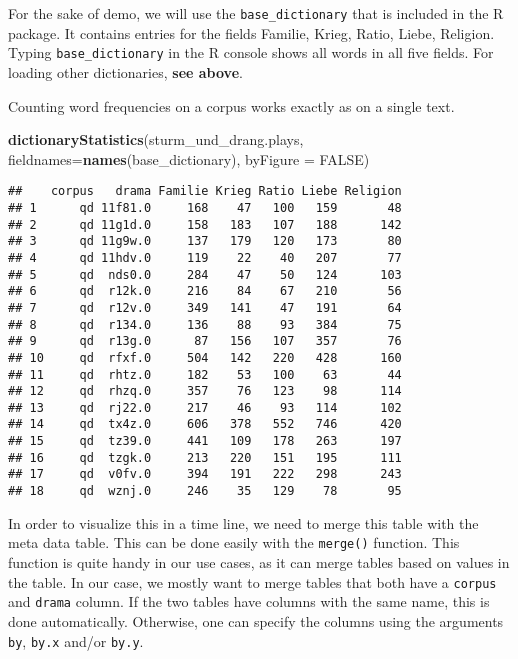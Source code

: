 \documentclass[]{book}
\newenvironment{Shaded}{\begin{snugshade}}{\end{snugshade}}
\newcommand{\DataTypeTok}[1]{\textcolor[rgb]{0.13,0.29,0.53}{#1}}
\newcommand{\KeywordTok}[1]{\textcolor[rgb]{0.13,0.29,0.53}{\textbf{#1}}}
\newcommand{\NormalTok}[1]{#1}
\newcommand{\OtherTok}[1]{\textcolor[rgb]{0.56,0.35,0.01}{#1}}
\begin{document}
For the sake of demo, we will use the \texttt{base\_dictionary} that is included in the R package. It contains entries for the fields Familie, Krieg, Ratio, Liebe, Religion. Typing \texttt{base\_dictionary} in the R console shows all words in all five fields. For loading other dictionaries, \textbf{see above}.

Counting word frequencies on a corpus works exactly as on a single text.

\begin{Shaded}
\begin{Highlighting}[]
\KeywordTok{dictionaryStatistics}\NormalTok{(sturm_und_drang.plays, }
                     \DataTypeTok{fieldnames=}\KeywordTok{names}\NormalTok{(base_dictionary), }
                     \DataTypeTok{byFigure =} \OtherTok{FALSE}\NormalTok{)}
\end{Highlighting}
\end{Shaded}

\begin{verbatim}
##    corpus   drama Familie Krieg Ratio Liebe Religion
## 1      qd 11f81.0     168    47   100   159       48
## 2      qd 11g1d.0     158   183   107   188      142
## 3      qd 11g9w.0     137   179   120   173       80
## 4      qd 11hdv.0     119    22    40   207       77
## 5      qd  nds0.0     284    47    50   124      103
## 6      qd  r12k.0     216    84    67   210       56
## 7      qd  r12v.0     349   141    47   191       64
## 8      qd  r134.0     136    88    93   384       75
## 9      qd  r13g.0      87   156   107   357       76
## 10     qd  rfxf.0     504   142   220   428      160
## 11     qd  rhtz.0     182    53   100    63       44
## 12     qd  rhzq.0     357    76   123    98      114
## 13     qd  rj22.0     217    46    93   114      102
## 14     qd  tx4z.0     606   378   552   746      420
## 15     qd  tz39.0     441   109   178   263      197
## 16     qd  tzgk.0     213   220   151   195      111
## 17     qd  v0fv.0     394   191   222   298      243
## 18     qd  wznj.0     246    35   129    78       95
\end{verbatim}

In order to visualize this in a time line, we need to merge this table with the meta data table. This can be done easily with the \texttt{merge()} function. This function is quite handy in our use cases, as it can merge tables based on values in the table. In our case, we mostly want to merge tables that both have a \texttt{corpus} and \texttt{drama} column. If the two tables have columns with the same name, this is done automatically. Otherwise, one can specify the columns using the arguments \texttt{by}, \texttt{by.x} and/or \texttt{by.y}.
\end{document}
